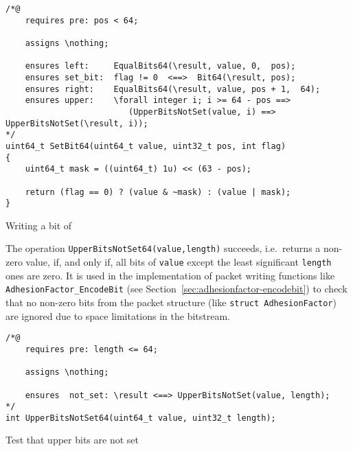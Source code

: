 \begin{listing}[hbt]
\begin{minipage}{0.99\textwidth}
\begin{lstlisting}[style=acsl-block]
/*@
    requires pre: pos < 64;

    assigns \nothing;

    ensures left:     EqualBits64(\result, value, 0,  pos);
    ensures set_bit:  flag != 0  <==>  Bit64(\result, pos);
    ensures right:    EqualBits64(\result, value, pos + 1,  64);
    ensures upper:    \forall integer i; i >= 64 - pos ==>
                         (UpperBitsNotSet(value, i) ==> UpperBitsNotSet(\result, i));
*/
uint64_t SetBit64(uint64_t value, uint32_t pos, int flag)
{
    uint64_t mask = ((uint64_t) 1u) << (63 - pos);

    return (flag == 0) ? (value & ~mask) : (value | mask);
}
\end{lstlisting}
\end{minipage}
\caption{\label{lst:SetBit64}Writing a bit of }
\end{listing}




The operation \lstinline{UpperBitsNotSet64(value,length)} succeeds,
i.e.\ returns a
non-zero value, if, and only if, all bits of \lstinline{value} except
the least significant
\lstinline{length} ones are zero.
%
It is used in the implementation of packet writing functions like
\lstinline{AdhesionFactor_EncodeBit} 
(see Section~\ref{sec:adhesionfactor-encodebit})
to check that no non-zero bits from the packet structure (like
\lstinline{struct AdhesionFactor}) are ignored due to space
limitations in the bitstream.





\begin{listing}[hbt]
\begin{minipage}{0.99\textwidth}
\begin{lstlisting}[style=acsl-block]
/*@
    requires pre: length <= 64;

    assigns \nothing;

    ensures  not_set: \result <==> UpperBitsNotSet(value, length);
*/
int UpperBitsNotSet64(uint64_t value, uint32_t length);
\end{lstlisting}
\end{minipage}
\caption{\label{lst:UpperBitsNotSet64}Test that upper bits are not set}
\end{listing}
%












